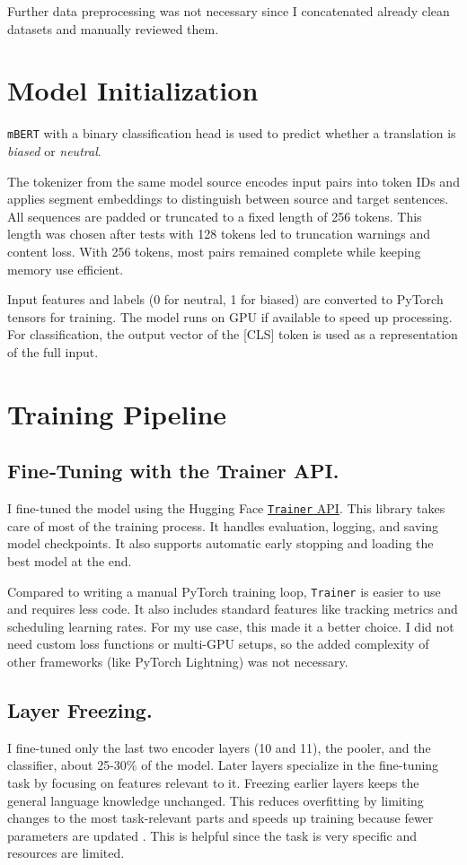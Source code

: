 Further data preprocessing was not necessary since I concatenated already clean datasets and manually reviewed them.

\section{Model Initialization}
    \texttt{mBERT} with a binary classification head is used to predict whether a translation is \textit{biased} or \textit{neutral}.

    The tokenizer from the same model source encodes input pairs into token IDs and applies segment embeddings to distinguish between source and target sentences. All sequences are padded or truncated to a fixed length of 256 tokens. This length was chosen after tests with 128 tokens led to truncation warnings and content loss. With 256 tokens, most pairs remained complete while keeping memory use efficient.

    Input features and labels (0 for neutral, 1 for biased) are converted to PyTorch tensors for training. The model runs on GPU if available to speed up processing. For classification, the output vector of the [CLS] token is used as a representation of the full input.

\section{Training Pipeline}
\subsection{{Fine‑Tuning with the Trainer API.}}
    I fine-tuned the model using the Hugging Face \href{https://huggingface.co/docs/transformers/en/main_classes/trainer}{\texttt{Trainer} API}. This library takes care of most of the training process. It handles evaluation, logging, and saving model checkpoints. It also supports automatic early stopping and loading the best model at the end.

    Compared to writing a manual PyTorch training loop, \texttt{Trainer} is easier to use and requires less code. It also includes standard features like tracking metrics and scheduling learning rates. For my use case, this made it a better choice. I did not need custom loss functions or multi-GPU setups, so the added complexity of other frameworks (like PyTorch Lightning) was not necessary.

    \subsection{Layer Freezing.}
    I fine-tuned only the last two encoder layers (10 and 11), the pooler, and the classifier, about 25-30\% of the model. Later layers specialize in the fine-tuning task by focusing on features relevant to it. Freezing earlier layers keeps the general language knowledge unchanged. This reduces overfitting by limiting changes to the most task-relevant parts and speeds up training because fewer parameters are updated \parencite{nadipalliLayerWiseEvolutionRepresentations2025}. This is helpful since the task is very specific and resources are limited.

